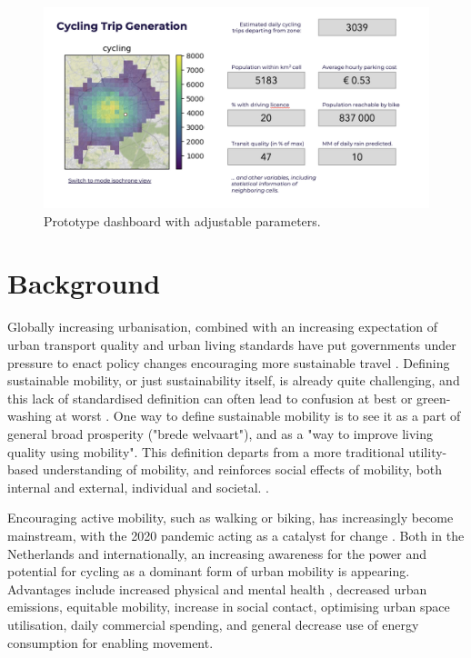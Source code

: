 \documentclass[sigconf, natbib=false, nonacm]{acmart}
\begin{document}
    \begin{figure}
        \includegraphics[width=\linewidth]{figures/prototype.png}
        \caption{Prototype dashboard with adjustable parameters.}
        \label{fig:prototype}
    \end{figure}

\section{Background}\label{section:background}
    Globally increasing urbanisation, combined with an increasing expectation of urban transport quality and urban living standards have put governments under pressure to enact policy changes encouraging more sustainable travel \parencite{un_68_2018}. Defining sustainable mobility, or just sustainability itself, is already quite challenging, and this lack of standardised definition can often lead to confusion at best or green-washing at worst \parencite{holden_sustainable_2013, banister_sustainable_2008}. One way to define sustainable mobility is to see it as a part of general broad prosperity ("brede welvaart"), and as a "way to improve living quality using mobility". This definition departs from a more traditional utility-based understanding of mobility, and reinforces social effects of mobility, both internal and external, individual and societal. \parencite{wilmink_indicatoren_2021, snellen_brede_2021}. 
    
    Encouraging active mobility, such as walking or biking, has increasingly become mainstream, with the 2020 pandemic acting as a catalyst for change \parencite{nikitas_cycling_2021}. Both in the Netherlands and internationally, an increasing awareness for the power and potential for cycling as a dominant form of urban mobility is appearing. Advantages include increased physical and mental health \parencite{avila-palencia_effects_2018, bassett_walking_2008, sallis_active_2004}, decreased urban emissions, equitable mobility, increase in social contact, optimising urban space utilisation, daily commercial spending, and general decrease use of energy consumption for enabling movement. 
    
\end{document}
